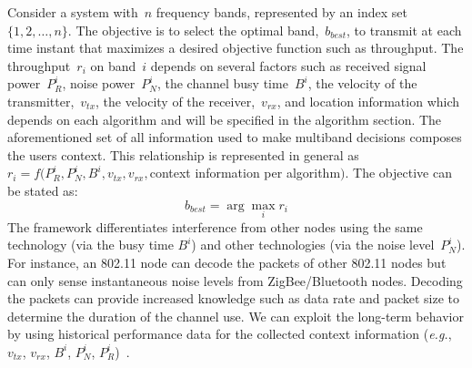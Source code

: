 Consider a system with~$n$ frequency bands, represented by an index set~$\{1,2, \ldots, n\}$. 
The objective is to select the optimal band,~$b_{best}$, to transmit at each time instant that maximizes a desired objective function such as throughput. The throughput~$r_i$ on band~$i$ depends on several factors such as received signal power~$P_R^i$, noise power~$P_N^i$, the channel busy time~$B^i$, the velocity of the transmitter,~$v_{tx}$,
 the velocity of the receiver,~$v_{rx}$, 
 and location information which depends on each algorithm and will be specified in the algorithm section. The aforementioned set of all information used to make multiband decisions composes the users context. 
This relationship is represented in general as~$r_i = f(P_R^i, P_N^i, B^i, v_{tx}, v_{rx}, $context information per algorithm$)$. The objective can be stated as:
\begin{equation}
b_{best}= \arg \max_i r_i 
\end{equation}
The framework differentiates interference from other nodes using the same technology (via the busy time $B^i$) and other technologies (via the noise level~$P_N^i$). For instance, an 802.11 node can decode the packets of other 802.11 nodes but can only sense
instantaneous noise levels from ZigBee/Bluetooth nodes. 
Decoding the packets can provide increased knowledge such as 
data rate and packet size to determine the duration of the channel use.
We can exploit the long-term behavior by using historical performance
data for the collected context information
({\it e.g.}, $v_{tx}$, $v_{rx}$, $B^i$, $P_N^i$, $P_R^i$)~\cite{meikle2012global}. 


